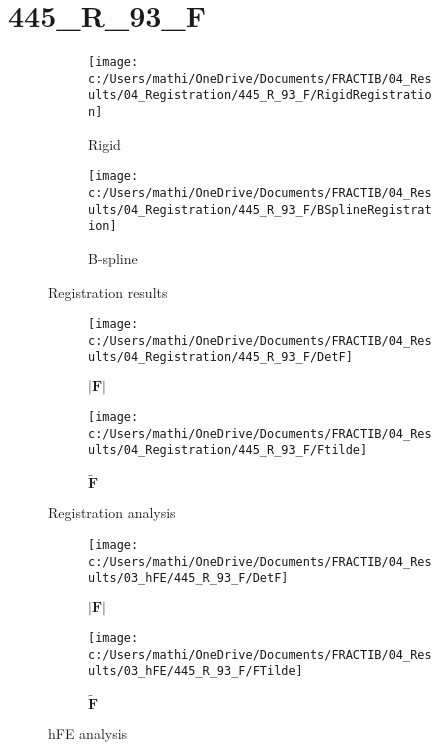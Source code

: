 \documentclass{article}%
\begin{document}
%
\newpage%
\section*{445\_R\_93\_F}%
\label{sec:445R93F}%


\begin{figure}[h!]%
\begin{subfigure}[b]{0.5\linewidth}%
\texttt{[image: c:/Users/mathi/OneDrive/Documents/FRACTIB/04\_Results/04\_Registration/445\_R\_93\_F/RigidRegistration]}%
\caption{Rigid}%
\end{subfigure}%
\begin{subfigure}[b]{0.5\linewidth}%
\texttt{[image: c:/Users/mathi/OneDrive/Documents/FRACTIB/04\_Results/04\_Registration/445\_R\_93\_F/BSplineRegistration]}%
\caption{B{-}spline}%
\end{subfigure}%
\caption{Registration results}%
\end{figure}

%


\begin{figure}[h!]%
\begin{subfigure}[b]{0.5\linewidth}%
\texttt{[image: c:/Users/mathi/OneDrive/Documents/FRACTIB/04\_Results/04\_Registration/445\_R\_93\_F/DetF]}%
\caption{$|\mathbf{F}|$}%
\end{subfigure}%
\begin{subfigure}[b]{0.5\linewidth}%
\texttt{[image: c:/Users/mathi/OneDrive/Documents/FRACTIB/04\_Results/04\_Registration/445\_R\_93\_F/Ftilde]}%
\caption{$\tilde{\mathbf{F}}$}%
\end{subfigure}%
\caption{Registration analysis}%
\end{figure}

%


\begin{figure}[h!]%
\begin{subfigure}[b]{0.5\linewidth}%
\texttt{[image: c:/Users/mathi/OneDrive/Documents/FRACTIB/04\_Results/03\_hFE/445\_R\_93\_F/DetF]}%
\caption{$|\mathbf{F}|$}%
\end{subfigure}%
\begin{subfigure}[b]{0.5\linewidth}%
\texttt{[image: c:/Users/mathi/OneDrive/Documents/FRACTIB/04\_Results/03\_hFE/445\_R\_93\_F/FTilde]}%
\caption{$\tilde{\mathbf{F}}$}%
\end{subfigure}%
\caption{hFE analysis}%
\end{figure}
\end{document}

